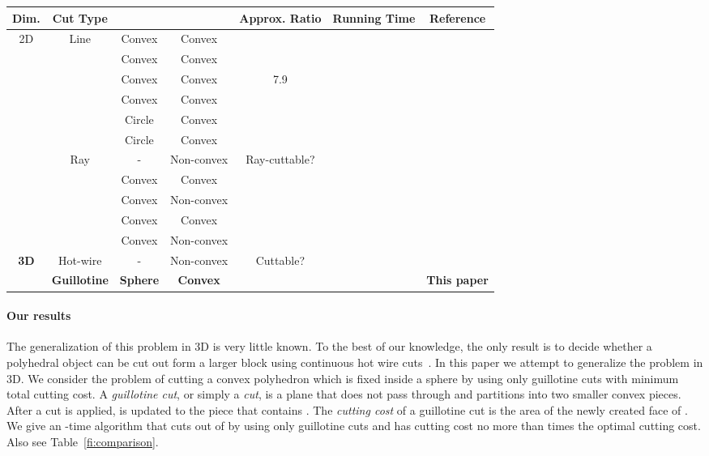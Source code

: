 \documentclass{llncs}
\begin{document}
\begin{table*}[htbp]
\begin{center}
{\scriptsize
\begin{tabular}{|c|c|c|c|c|c|c|}
\hline
Dim. & Cut Type &  &  & Approx. Ratio & Running Time & Reference \\
\hline
\multirow{11}{*}{2D} 
& \multirow{5}{*}{Line} & Convex & Convex &  &   & \cite{ae,ad} \\
\cline{3-7}
& & Convex & Convex &  &  & \cite{af} \\
\cline{3-7}
& & Convex & Convex & 7.9 &  & \cite{ac} \\
\cline{3-7}
& & Convex & Convex &  &  & \cite{ah} \\
\cline{3-7}
& & Circle & Convex &  &  & \cite{AIH} \\
\cline{3-7}
& & Circle & Convex &  &  & \cite{AIH} \\
\cline{2-7}
& \multirow{5}{*}{Ray} & - & Non-convex & Ray-cuttable? &  & \cite{ag} \\
\cline{3-7}
& & Convex & Convex &  &  & \cite{af} \\
\cline{3-7}
& & Convex & Non-convex &  &  & \cite{af} \\
\cline{3-7}
& & Convex & Convex &  &  & \cite{ac} \\
\cline{3-7}
& & Convex & Non-convex &  &  & \cite{ac} \\
\hline
\multirow{2}{*}{{\bf 3D}} & Hot-wire & - & Non-convex & Cuttable? &  & \cite{JK03}\\
\cline{2-7}
& {\bf Guillotine} & {\bf Sphere} & {\bf Convex} & {\boldmath} & {\boldmath} & {\bf This paper} \\
\hline
\end{tabular}
}\end{center}
\caption{Comparison of the results.}
\label{fi:comparison}
\end{table*}


\paragraph{Our results}
The generalization of this problem in 3D is very little known.
To the best of our knowledge, the only result is to decide whether a 
polyhedral object can be cut out form a larger block using continuous hot wire cuts~\cite{JK03}.
In this paper we attempt to generalize the problem in 3D.
We consider the problem of cutting a convex polyhedron  which is 
fixed inside a sphere  by using only guillotine cuts with minimum total cutting cost.
A \emph{guillotine cut}, or simply a \emph{cut}, is a plane that does not pass through  
and partitions  into two smaller convex pieces.
After a cut is applied,  is updated to the piece that contains .
The \emph{cutting cost} of a guillotine cut is the area of the newly created face of .
We give an -time algorithm that cuts  out of  by using only guillotine cuts and
has cutting cost no more than  times the optimal cutting cost.
Also see Table~\ref{fi:comparison}.
\end{document}
